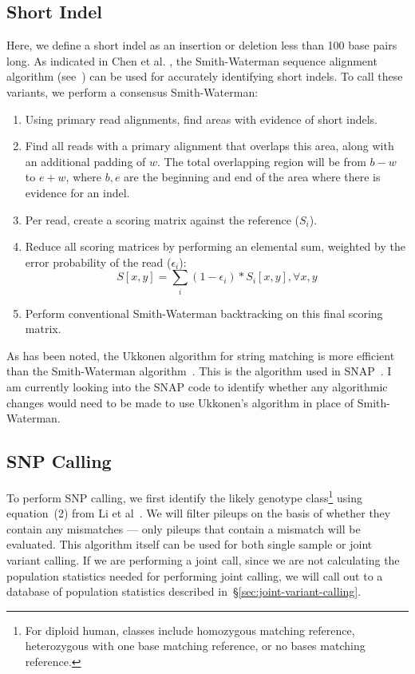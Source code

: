 \documentclass[11pt]{article}
\begin{document}
\subsection{Short Indel}
\label{sec:short-indel}

Here, we define a short indel as an insertion or deletion less than 100 base pairs long. As indicated in Chen et al.
\cite{chen09}, the Smith-Waterman sequence alignment algorithm (see~\cite{smith81}) can be used for accurately
identifying short indels. To call these variants, we perform a consensus Smith-Waterman:

\begin{enumerate}
\item Using primary read alignments, find areas with evidence of short indels.
\item Find all reads with a primary alignment that overlaps this area, along with an additional padding of $w$. The total
overlapping region will be from $b - w$ to $e + w$, where $b, e$ are the beginning and end of the area where there is
evidence for an indel.
\item Per read, create a scoring matrix against the reference ($S_i$).
\item Reduce all scoring matrices by performing an elemental sum, weighted by the error probability of the read
($\epsilon_i$):
$$
S [x, y] = \sum_i (1 - \epsilon_i) * S_i [x,y] , \forall x, y
$$
\item Perform conventional Smith-Waterman backtracking on this final scoring matrix.
\end{enumerate}

As has been noted, the Ukkonen algorithm for string matching is more efficient than the Smith-Waterman
algorithm~\cite{ukkonen85}. This is the algorithm used in SNAP~\cite{zaharia11}. I am currently looking into the SNAP
code to identify whether any algorithmic changes would need to be made to use Ukkonen's algorithm in place of
Smith-Waterman.

\subsection{SNP Calling}
\label{sec:SNP-calling}

To perform SNP calling, we first identify the likely genotype class\footnote{For diploid human, classes include homozygous
matching reference, heterozygous with one base matching reference, or no bases matching reference.} using equation~(2)
from Li et al~\cite{li11}. We will filter pileups on the basis of whether they contain any mismatches --- only pileups that contain
a mismatch will be evaluated. This algorithm itself can be used for both single sample or joint variant calling. If we are performing
a joint call, since we are not calculating the population statistics needed for performing joint calling, we will call out to a database
of population statistics described in~\S\ref{sec:joint-variant-calling}.
\end{document}
